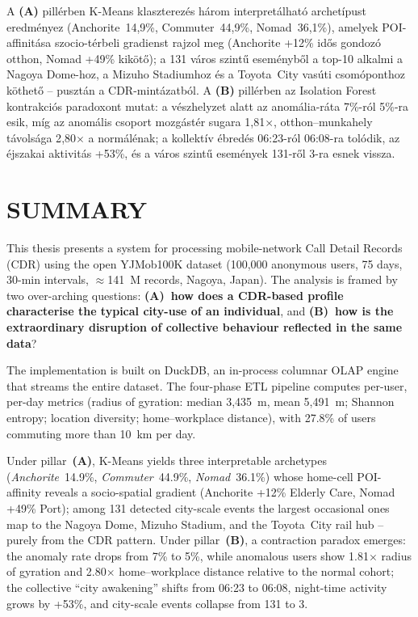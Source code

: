 A \textbf{(A)} pillérben K-Means klaszterezés három interpretálható archetípust eredményez (Anchorite~14{,}9\%, Commuter~44{,}9\%, Nomad~36{,}1\%), amelyek POI-affinitása szocio-térbeli gradienst rajzol meg (Anchorite +12\% idős gondozó otthon, Nomad +49\% kikötő); a 131 város szintű eseményből a top-10 alkalmi a Nagoya Dome-hoz, a Mizuho Stadiumhoz és a Toyota~City vasúti csomóponthoz köthető – pusztán a CDR-mintázatból. A \textbf{(B)} pillérben az Isolation Forest kontrakciós paradoxont mutat: a vészhelyzet alatt az anomália-ráta 7\%-ról 5\%-ra esik, míg az anomális csoport mozgástér sugara 1{,}81$\times$, otthon–munkahely távolsága 2{,}80$\times$ a normálénak; a kollektív ébredés 06:23-ról 06:08-ra tolódik, az éjszakai aktivitás +53\%, és a város szintű események 131-ről 3-ra esnek vissza.

\clearpage
\section*{SUMMARY}

This thesis presents a system for processing mobile-network Call Detail Records (CDR) using the open YJMob100K dataset (100,000 anonymous users, 75 days, 30-min intervals, $\approx$141~M records, Nagoya, Japan). The analysis is framed by two over-arching questions: \textbf{(A)~how does a CDR-based profile characterise the typical city-use of an individual}, and \textbf{(B)~how is the extraordinary disruption of collective behaviour reflected in the same data}?

The implementation is built on DuckDB, an in-process columnar OLAP engine that streams the entire dataset. The four-phase ETL pipeline computes per-user, per-day metrics (radius of gyration: median 3,435~m, mean 5,491~m; Shannon entropy; location diversity; home--workplace distance), with 27.8\% of users commuting more than 10~km per day.

Under pillar~\textbf{(A)}, K-Means yields three interpretable archetypes (\emph{Anchorite}~14.9\%, \emph{Commuter}~44.9\%, \emph{Nomad}~36.1\%) whose home-cell POI-affinity reveals a socio-spatial gradient (Anchorite +12\% Elderly Care, Nomad +49\% Port); among 131 detected city-scale events the largest occasional ones map to the Nagoya Dome, Mizuho Stadium, and the Toyota~City rail hub – purely from the CDR pattern. Under pillar~\textbf{(B)}, a contraction paradox emerges: the anomaly rate drops from 7\% to 5\%, while anomalous users show 1.81$\times$ radius of gyration and 2.80$\times$ home--workplace distance relative to the normal cohort; the collective ``city awakening'' shifts from 06:23 to 06:08, night-time activity grows by +53\%, and city-scale events collapse from 131 to 3.











